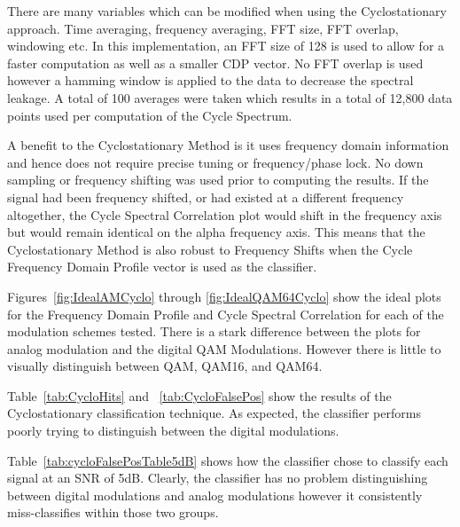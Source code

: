There are many variables which can be modified when using the Cyclostationary
approach.  Time averaging, frequency averaging, FFT size, FFT overlap, windowing
etc.  In this implementation, an FFT size of 128 is used to allow for a faster
computation as well as a smaller CDP vector.  No FFT overlap is used however a
hamming window is applied to the data to decrease the spectral leakage.  A total
of 100 averages were taken which results in a total of 12,800 data points used
per computation of the Cycle Spectrum.

A benefit to the Cyclostationary Method is it uses frequency domain information
and hence does not require precise tuning or frequency/phase lock.  No down
sampling or frequency shifting was used prior to computing the results.  If the
signal had been frequency shifted, or had existed at a different frequency
altogether, the Cycle Spectral Correlation plot would shift in the frequency
axis but would remain identical on the alpha frequency axis.  This means that
the Cyclostationary Method is also robust to Frequency Shifts when the Cycle
Frequency Domain Profile vector is used as the classifier.

Figures~\ref{fig:IdealAMCyclo} through \ref{fig:IdealQAM64Cyclo} show the
ideal plots for the Frequency Domain Profile and Cycle Spectral Correlation for
each of the modulation schemes tested.  There is a stark difference between the
plots for analog modulation and the digital QAM Modulations.  However there is 
little to visually distinguish between QAM, QAM16, and QAM64.  

Table~\ref{tab:CycloHits} and ~\ref{tab:CycloFalsePos} show the results of the
Cyclostationary classification technique.  As expected, the classifier performs
poorly trying to distinguish between the digital modulations.

Table~\ref{tab:cycloFalsePosTable5dB} shows how the classifier chose to classify
each signal at an SNR of 5dB.  Clearly, the classifier has no problem
distinguishing between digital modulations and analog modulations however it
consistently miss-classifies within those two groups.  

